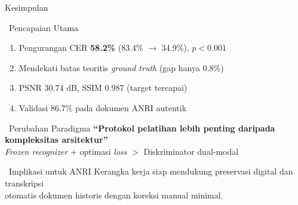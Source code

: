 \documentclass[aspectratio=169,10pt,t]{beamer}
\begin{document}
\begin{frame}{Kesimpulan}
    \begin{block}{\faCheckDouble~Pencapaian Utama}
        \begin{enumerate}
            \item Pengurangan CER \textbf{58.2\%} (83.4\% $\rightarrow$ 34.9\%), $p<0.001$
            \item Mendekati batas teoritis \textit{ground truth} (gap hanya 0.8\%)
            \item PSNR 30.74 dB, SSIM 0.987 (target tercapai)
            \item Validasi 86.7\% pada dokumen ANRI autentik
        \end{enumerate}
    \end{block}
    
    \vspace{0.5em}
    \begin{alertblock}{\faExclamationCircle~Perubahan Paradigma}
        \centering
        \textbf{``Protokol pelatihan lebih penting daripada kompleksitas arsitektur''}\\[0.3em]
        \textit{Frozen recognizer} + optimasi \textit{loss} $>$ Diskriminator dual-modal
    \end{alertblock}
    
    \vspace{0.5em}
    \begin{exampleblock}{\faArchive~Implikasi untuk ANRI}
        Kerangka kerja siap mendukung preservasi digital dan transkripsi\\
        otomatis dokumen historis dengan koreksi manual minimal.
    \end{exampleblock}
\end{frame}
\end{document}
